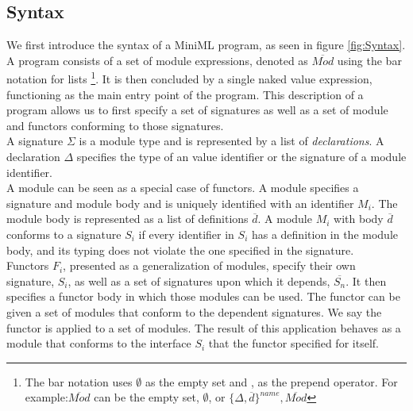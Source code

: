 \documentclass[10pt,a4paper,draft]{article}
\begin{document}
\begin{flushleft}
\section{Syntax}
\newcommand{\longspace}{\;\;\;\;\;\;}
\newcommand{\inlinecode}{\texttt}
We first introduce the syntax of a MiniML program, as seen in figure \ref{fig:Syntax}. A program consists of a set of module expressions, denoted as $\overline{\mathit{Mod}}$ using the bar notation for lists \footnote{The bar notation uses $\emptyset$ as the empty set and , as the prepend operator. For example:$\overline{\mathit{Mod}}$ can be the empty set, $\emptyset$, or $\lbrace \Delta, \overline{\mathit{d}}\rbrace^{name}, \overline{Mod}$}. It is then concluded by a single naked value expression, functioning as the main entry point of the program.
This description of a program allows us to first specify a set of signatures as well as a set of module and functors conforming to those signatures.
\\[2ex]
A signature $\Sigma$ is a module type and is represented by a list of \emph{declarations}. A declaration $\Delta$ specifies the type of an value identifier or the signature of a module identifier.
\\[2ex] 
A module can be seen as a special case of functors. A module specifies a signature and module body and is uniquely identified with an identifier $M_{i}$. The module body is represented as a list of definitions $\overline{d}$. A module $M_{i}$ with body $\overline{d}$ conforms to a signature $S_{i}$ if every identifier in $S_{i}$ has a definition in the module body, and its typing does not violate the one specified in the signature.
\\[2ex]
Functors $F_{i}$, presented as a generalization of modules, specify  their own signature, $S_{i}$, as well as a set of signatures upon which it depends, $\overline{S_{n}}$. It then specifies a functor body in which those modules can be used. The functor can be given a set of modules that conform to the dependent signatures. We say the functor is applied to a set of modules. The result of this application behaves as a module that conforms to the interface $S_{i}$ that the functor specified for itself.


\end{flushleft}
\end{document}
